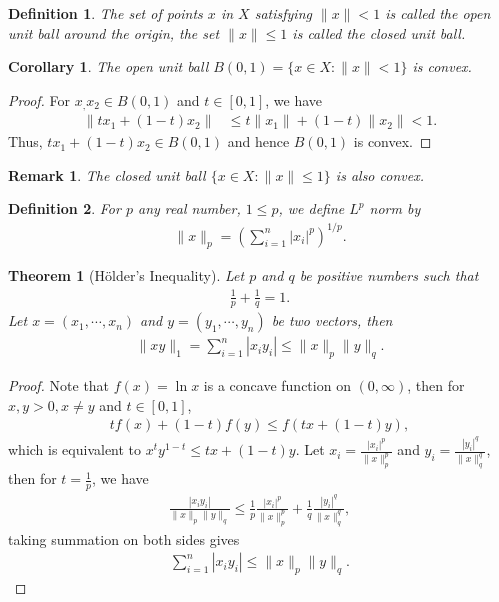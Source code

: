 \documentclass[11pt]{book}
\newtheorem{definition}{Definition}[section]
\newtheorem{theorem}{Theorem}[section]
\newtheorem{corollary}{Corollary}[theorem]
\newtheorem{remark}{Remark}[section]
\theoremstyle{definition}
\numberwithin{equation}{chapter}
\begin{document}
\medskip

\begin{definition}
The set of points $x$ in $X$ satisfying $\|x\| < 1$ is called the open unit ball around the origin, the set $\|x\| \leq 1$ is called the closed unit ball.
\end{definition}

\medskip

\begin{corollary}
The open unit ball $B(0,1) = \{x \in X: \|x\| < 1\}$ is convex.
\end{corollary}
\begin{proof}
For $x_, x_2 \in B(0,1)$ and $t \in [0,1]$, we have
\begin{align*}
    \|tx_1 + (1-t)x_2\| & \leq t\|x_1\| + (1-t)\|x_2\| < 1.
\end{align*}
Thus, $tx_1 + (1-t)x_2 \in B(0,1)$ and hence $B(0,1)$ is convex.
\end{proof}

\begin{remark}
The closed unit ball $\{x \in X: \|x\| \leq 1\}$ is also convex.
\end{remark}

\medskip

\begin{definition}
For $p$ any real number, $1 \leq p$, we define $L^p$ norm by 
\begin{align*}
    \|x\|_p = \left(\sum^n_{i=1} |x_i|^p \right)^{1/p}.
\end{align*}
\end{definition}

\medskip

\begin{theorem}[Hölder's Inequality]
Let $p$ and $q$ be positive numbers such that 
\begin{align*}
    \frac{1}{p} + \frac{1}{q} = 1.
\end{align*}
Let $x = (x_1, \cdots, x_n)$ and $y = (y_1, \cdots, y_n)$ be two vectors, then 
\begin{align*}
    \|xy\|_1 = \sum^n_{i=1} \left|x_i y_i\right| \leq \|x\|_p \|y\|_q.
\end{align*}
\end{theorem}
\begin{proof}
Note that $f(x) = \ln x$ is a concave function on $(0, \infty)$, then for $x, y > 0, x \neq y$ and $t \in [0,1]$, 
\begin{align*}
    t f(x) + (1-t) f(y) \leq f(tx + (1-t)y),
\end{align*}
which is equivalent to $x^t y^{1-t} \leq tx + (1-t)y$. Let $x_i = \frac{|x_i|^p}{\|x\|^p_p}$ and $y_i = \frac{|y_i|^q}{\|x\|^q_q}$, then for $t = \frac{1}{p}$, we have
\begin{align*}
    \frac{|x_i y_i|}{\|x\|_p \|y\|_q} \leq \frac{1}{p} \frac{|x_i|^p}{\|x\|^p_p} + \frac{1}{q} \frac{|y_i|^q}{\|x\|^q_q},
\end{align*}
taking summation on both sides gives
\begin{align*}
    \sum^n_{i=1} |x_i y_i| \leq \|x\|_p \|y\|_q.
\end{align*}
\end{proof}
\end{document}
